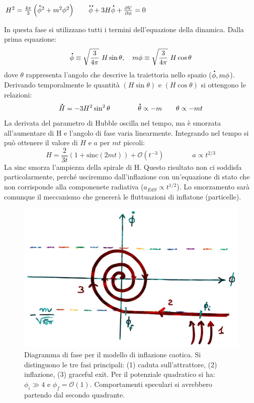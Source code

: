 \vspace{1em}
\begin{example} 
    $H^2=\frac{4\pi }{ 3} \left(\accentset{\mbox{\large\bfseries .}}{\phi}^2 +m^2\phi^2\right) \qquad \accentset{\mbox{\large\bfseries ..}}{\phi} + 3H \accentset{\mbox{\large\bfseries .}}{\phi} + \frac{\partial V}{\partial \phi} =0$
\end{example}
In questa fase si utilizzano tutti i termini dell'equazione della dinamica. Dalla prima equazione: 
\begin{equation}
    \accentset{\mbox{\large\bfseries .}}{\phi} \equiv \sqrt{\frac{3}{4\pi}} ~H \sin \theta, \quad m\phi \equiv \sqrt{\frac{3}{4\pi }} ~H \cos \theta
\end{equation}
dove $\theta$ rappresenta l'angolo che descrive la traiettoria nello spazio ($\accentset{\mbox{\large\bfseries .}}{\phi}, m\phi$). Derivando temporalmente le quantità $(H\sin\theta)$ e $(H\cos\theta)$ si ottengono le relazioni:
\begin{equation}
    \accentset{\mbox{\large\bfseries .}}{H} = -3H^2 \sin^2 \theta \qquad\qquad  \accentset{\mbox{\large\bfseries .}}{\theta} \propto -m \qquad \theta \propto -mt
\end{equation}
La derivata del parametro di Hubble oscilla nel tempo, ma è smorzata all'aumentare di H e l'angolo di fase varia linearmente. Integrando nel tempo si può ottenere il valore di $H$ e $a$ per $mt$ piccoli:
\begin{equation}
    H = \frac{2}{3t}\left( 1+ \mathrm{sinc} (2mt)\right) + \mathcal{O}(t^{-3}) \qquad\qquad a\propto t^{2/3}
\end{equation}
La $\mathrm{sinc}$ smorza l'ampiezza della spirale di H. Questo risultato non ci soddisfa particolarmente, perché usciremmo dall'inflazione con un'equazione di stato che non corrisponde alla componenete radiativa ($a_{EdS}\propto t^{1/2}$). Lo smorzamento sarà comunque il meccanismo che genererà le fluttuazioni di inflatone (particelle).


\begin{figure}[H]
    \centering
    \includegraphics[width=.9 \textwidth]{Pictures/5/chaosinfl.jpg}
    \caption{Diagramma di fase per il modello di inflazione caotica. Si distinguono le tre fasi principali: (1) caduta sull'attrattore, (2) inflazione, (3) graceful exit. Per il potenziale quadratico si ha: $\phi_i\gg  4$ e $\phi_f = \mathcal{O} (1)$. Comportamenti speculari si avrebbero partendo dal secondo quadrante.}\label{fig5:chaotic}
\end{figure}


